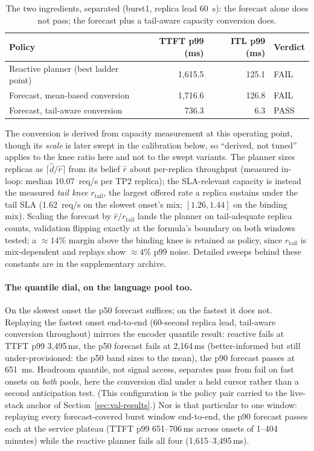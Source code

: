 \begin{table}[htbp]
\centering
\caption[The two language-pool ingredients, separated]{The two ingredients,
separated (burst1, replica lead \SI{60}{\second}): the forecast alone does not
pass; the forecast plus a tail-aware capacity conversion does.}
\label{tab:cl-triad}
\small
\begin{tabular}{@{}lrrl@{}}
\toprule
Policy & TTFT p99 (ms) & ITL p99 (ms) & Verdict \\
\midrule
Reactive planner (best ladder point) & 1{,}615.5 & 125.1 & FAIL \\
Forecast, mean-based conversion & 1{,}716.6 & 126.8 & FAIL \\
Forecast, tail-aware conversion & 736.3 & 6.3 & PASS \\
\bottomrule
\end{tabular}
\end{table}

The conversion is derived from capacity measurement at this operating point,
though its \emph{scale} is later swept in the calibration below, so ``derived,
not tuned'' applies to the knee ratio here and not to the swept variants. The
planner sizes replicas as $\lceil \hat{d} / \hat{r} \rceil$ from its belief
$\hat{r}$ about per-replica throughput (measured in-loop: median
\SI{10.07}{req/s} per TP2 replica); the SLA-relevant capacity is instead the
measured \emph{tail knee} $r_{\text{tail}}$, the largest offered rate a replica
sustains under the tail SLA (\SI{1.62}{req/s} on the slowest onset's mix;
$[1.26, 1.44]$ on the binding mix). Scaling the forecast by $\hat{r}/r_{\text{tail}}$
lands the planner on tail-adequate replica counts, validation flipping exactly
at the formula's boundary on both windows tested; a ${\approx}14\%$ margin
above the binding knee is retained as policy, since $r_{\text{tail}}$ is
mix-dependent and replays show ${\approx}4\%$ p99 noise. Detailed sweeps behind
these constants are in the supplementary archive.

\paragraph{The quantile dial, on the language pool too.} On the slowest onset
the p50 forecast suffices; on the fastest it does not. Replaying the fastest
onset end-to-end (60-second replica lead, tail-aware conversion throughout) mirrors
the encoder quantile result: reactive fails at TTFT p99
3{,}495\,\si{\milli\second}, the p50 forecast fails at
2{,}164\,\si{\milli\second} (better-informed but still under-provisioned: the
p50 band sizes to the mean), the p90 forecast passes at
\SI{651}{\milli\second}. Headroom quantile, not signal access, separates pass
from fail on fast onsets on \emph{both} pools, here the conversion dial
under a held cursor rather than a second anticipation test. (This configuration is the
policy pair carried to the live-stack anchor of
Section~\ref{sec:val-results}.) Nor is that particular to one window: replaying
every forecast-covered burst window end-to-end, the p90 forecast passes each
at the service plateau (TTFT p99 651--706\,\si{\milli\second} across onsets of
1--404 minutes) while the reactive planner fails all four
(1{,}615--3{,}495\,\si{\milli\second}).

